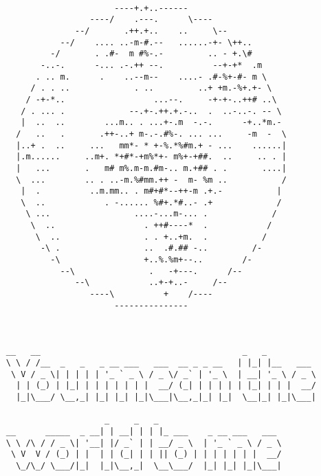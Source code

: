 \documentclass[a4paper,english]{article}
\begin{document}
\pagebreak

\color{green}
\begin{verbatim}
                                                     
                           ----+.+..------
                      ----/    .---.      \----
                   --/       .++.+..    ..     \--
                --/    .... ..-m-#.--   ......-+- \++..
              -/       . .#-  m #%-.-         .. - +.\#
            -..-.      -... .-.++ --.          --+-+*  .m
           . .. m.      .    ..--m--    ....- .#-%+-#- m \
          / . . ..             . ..         ..+ +m.-%+.+- \
         / -+-*..                  ...--.     -+-+-..++# ..\
        / . ... .             --.+-.++.+.-..  .  ..-..-. -- \
        |  ..  ..        ...m.. . ...+-.m  -.-.      -+..*m.-
       /   ..   .       .++-..+ m-.-.#%-. ... ...     -m  -  \
       |..+ .  ..     ...   mm*- * +-%.*%#m.+ - ...    ......|
       |.m......     ..m+. *+#*-+m%*+- m%+-+##.  ..     .. . |
       |   ...       .   m# m%.m-m.#m-.. m.+## . .       ....|
       \  ...        .. . ..-m.%#mm.++ -  m- %m ..           /
        |  .          ..m.mm.. . m#+#*--++-m .+.-           |
        \  ..            . -...... %#+.*#..- .+             /
         \ ...                 ....-...m-... .             /
          \  ..                  . ++#----*  .            /
           \  ..                 . . +..+m.  .           /
            -\ .                 ..  .#.## -..         /-
              -\                 +..%.%m+--..        /-
                --\               .   -+---.      /--
                   --\            ..+-+..-     /--
                      ----\          +    /----
                           ---------------
     
     
     
     __   __                                         _   _
     \ \ / /__  _   _   _ __ ___   ___  __ _ _ __   | |_| |__   ___
      \ V / _ \| | | | | '_ ` _ \ / _ \/ _` | '_ \  | __| '_ \ / _ \
       | | (_) | |_| | | | | | | |  __/ (_| | | | | | |_| | | |  __/
       |_|\___/ \__,_| |_| |_| |_|\___|\__,_|_| |_|  \__|_| |_|\___|
     
                         _     _   _
     __      _____  _ __| | __| | | |_ ___    _ __ ___   ___
     \ \ /\ / / _ \| '__| |/ _` | | __/ _ \  | '_ ` _ \ / _ \
      \ V  V / (_) | |  | | (_| | | || (_) | | | | | | |  __/
       \_/\_/ \___/|_|  |_|\__,_|  \__\___/  |_| |_| |_|\___|
     
\end{verbatim}
\end{document}
